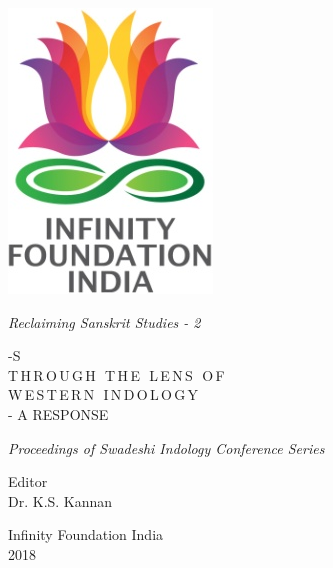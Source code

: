\thispagestyle{empty}
\begin{center}
\includegraphics[scale=0.3]{figures/logo.png}
\bigskip

{\fontsize{10}{14}\selectfont\sl
Reclaiming Sanskrit Studies - 2}

\bigskip
\end{center}
\medskip

\begin{center}
{\fontsize{20}{24}\selectfont {\sl Ś\,Ā\,S\,T\,R\,A}-S\\ T\,H\,R\,O\,U\,G\,H\,\, T\,H\,E\,\, L\,E\,N\,S\,\, O\,F\\[10pt] W\,E\,S\,T\,E\,R\,N\,\, I\,N\,D\,O\,L\,O\,G\,Y}\\[8pt]
{\fontsize{20}{24}\selectfont - A RESPONSE}
\bigskip

{\sl\small Proceedings of Swadeshi Indology Conference Series}
\bigskip
\bigskip

{\fontsize{14}{18}\selectfont 
Editor\\
Dr. K.S. Kannan\par
}
\vfill

{\fontsize{12}{14}\selectfont
Infinity Foundation India\\[4pt]
2018}
\end{center}




